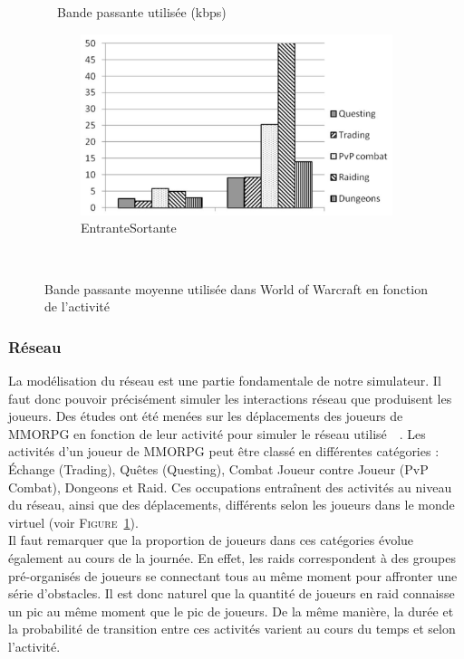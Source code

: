 \begin{figure}[t!]
	\centering
	\begin{sideways}\quad~~Bande passante utilisée (kbps)\end{sideways}
	\begin{subfigure}[b]{0.5\textwidth}
		\centering
		\includegraphics[width=\textwidth]{bande_passante_par_activite.png}\\
		\quad{}Entrante\qquad\qquad\quad{}Sortante\qquad\qquad\quad
	\end{subfigure}
	\\[0.2cm]
	\caption{Bande passante moyenne utilisée dans World of Warcraft en fonction de l'activité~\cite{mmorpg_network_performance_session_patterns_and_latency_requirements_analysis}}
	\label{fig:bande_passante_par_activite}
\end{figure}

\subsubsection{Réseau}
La modélisation du réseau est une partie fondamentale de notre simulateur. Il faut donc pouvoir précisément simuler les interactions réseau que produisent les joueurs. Des études ont été menées sur les déplacements des joueurs de MMORPG en fonction de leur activité pour simuler le réseau utilisé~\cite{mmorpg_network_performance_session_patterns_and_latency_requirements_analysis}~\cite{mmorpg_player_behavior_model}. Les activités d'un joueur de MMORPG peut être classé en différentes catégories : \'Echange (Trading), Quêtes (Questing), Combat Joueur contre Joueur (PvP Combat), Dongeons et Raid. Ces occupations entraînent des activités au niveau du réseau, ainsi que des déplacements, différents selon les joueurs dans le monde virtuel (voir \textsc{Figure}~\ref{fig:bande_passante_par_activite}).\\

Il faut remarquer que la proportion de joueurs dans ces catégories évolue également au cours de la journée. En effet, les raids correspondent à des groupes pré-organisés de joueurs se connectant tous au même moment pour affronter une série d'obstacles. Il est donc naturel que la quantité de joueurs en raid connaisse un pic au même moment que le pic de joueurs. De la même manière, la durée et la probabilité de transition entre ces activités varient au cours du temps et selon l'activité. 
